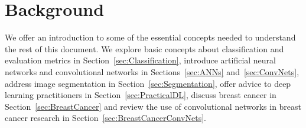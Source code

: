 \chapter{Background}
\label{ch:Background}
We offer an introduction to some of the essential concepts needed to understand the rest of this document. 
We explore basic concepts about classification and evaluation metrics in Section~\ref{sec:Classification}, introduce artificial neural networks and convolutional networks in Sections~\ref{sec:ANNs} and~\ref{sec:ConvNets}, address image segmentation in Section~\ref{sec:Segmentation}, offer advice to deep learning practitioners in Section~\ref{sec:PracticalDL}, discuss breast cancer in Section~\ref{sec:BreastCancer} and review the use of convolutional networks in breast cancer research in Section~\ref{sec:BreastCancerConvNets}.

\begin{comment}
We start exploring basic concepts about classification and evaluation metrics in Section~\ref{sec:Classification}, Sections~\ref{sec:ANNs} and~\ref{sec:ConvNets} introduce artificial neural networks and convolutional networks, image segmentation is discussed in Section~\ref{sec:Segmentation}, Section~\ref{sec:PracticalDL} offers advice to deep learning practitioners, Section~\ref{sec:BreastCancer} adresses breast cancer and mammography and, lastly, Section~\ref{sec:BreastCancerConvNets} overviews how convolutional networks have been used in breast cancer research.

We start exploring basic concepts about classification and evaluation metrics (Sec.~\ref{sec:Classification}), introduce artificial neural networks (Sec.~\ref{sec:ANNs})cand convolutional networks (Sec.~\ref{sec:ConvNets}), discuss image segmentation (Sec.~\ref{sec:Segmentation}), offer advice to deep learning practitioners (Sec.~\ref{sec:PracticalDL}), adress breast cancer and mammography (Sec.~\ref{sec:BreastCancer}) and, lastly, overview how convolutional networks have been used in breast cancer research (Sec.~\ref{sec:BreastCancerConvNets}).

We offer an introduction to some of the essential concepts needed to understand the rest of this document. We start by discussing breast cancer and mammograms in Section~\ref{sec:BreastCancer}, we explore some basic concepts about classification and evaluation metrics in Section~\ref{sec:Classification}, in Sections~\ref{sec:ANNs} and~\ref{sec:ConvNets} we give a short introduction into artificial neural networks and convolutional networks, image segmentation is adressed in Section~\ref{sec:Segmentation}, we offer advice for deep learning practitioners in Section~\ref{sec:PracticalDL} and, finally, we present an overview of how convolutional networks have been used for breast cancer research in Section~\ref{sec:BreastCancerConvNets}.
\end{comment}


